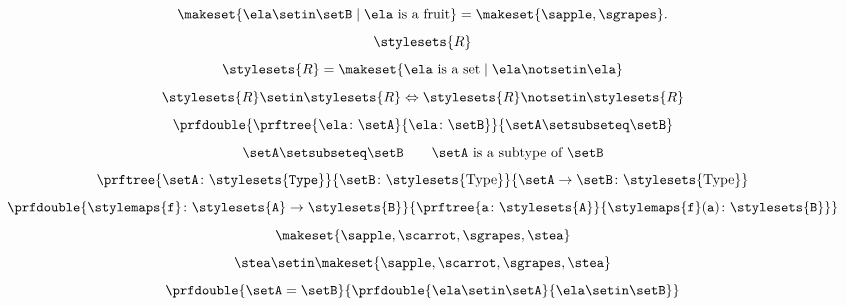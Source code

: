 \begin{forslides}
\begin{equation}
        \label{eq:stat_5_session1_22}
        \makeset{ \ela \setin\setB \mid \ela \text{ is a fruit} } = \makeset{ \sapple, \sgrapes }.
    \end{equation}
    \begin{equation}
        \label{eq:russel_session1_22}
        \stylesets{R}
    \end{equation}
    \begin{equation}
        \label{eq:russel_2_session1_22}
        \stylesets{R}=\makeset{\ela \text{ is a set}\mid \ela \notsetin \ela}
    \end{equation}
    \begin{equation}
        \label{eq:russel_3_session1_22}
        \stylesets{R} \setin \stylesets{R} \Leftrightarrow \stylesets{R} \notsetin \stylesets{R}
    \end{equation}
    \begin{equation}
        \label{eq:types_session1_22}
        \prfdouble{\prftree{\ela \colon \setA}{\ela \colon \setB}}{\setA \setsubseteq \setB}
    \end{equation}
    \begin{equation}
        \label{eq:types_2_session1_22}
        \setA \setsubseteq \setB \qquad \setA \text{ is a subtype of }\setB
    \end{equation}
    \begin{equation}
        \label{eq:types_3_session1_22}
        \prftree{\setA\colon \stylesets{\texttt{Type}}}{\setB\colon \stylesets{\text{Type}}}{{\setA\to \setB \colon \stylesets{\text{Type}}}}
    \end{equation}
    \begin{equation}
        \label{eq:types_4_session1_22}
        \prfdouble{\stylemaps{\texttt{f}}\colon \stylesets{\texttt{A}}\to \stylesets{\texttt{B}}}{\prftree{\texttt{a}\colon \stylesets{\texttt{A}}}{\stylemaps{\texttt{f}}(\texttt{a})\colon \stylesets{\texttt{B}}}}
    \end{equation}
    \begin{equation}
        \label{eq:1_session1_22}
        \makeset{\sapple,\scarrot,\sgrapes,\stea}
    \end{equation}
    \begin{equation}
        \label{eq:2_session1_22}
        \stea \setin \makeset{\sapple,\scarrot,\sgrapes,\stea}
    \end{equation}
    \begin{equation}
        \label{eq:3_session1_22}
        \prfdouble{\setA =\setB}{\prfdouble{\ela \setin \setA}{\ela\setin \setB}}

\end{equation}
\end{forslides}
